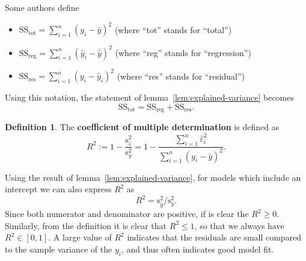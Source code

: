 \documentclass[
  a4paper,
]{article}
\providecommand{\tightlist}{%
  \setlength{\itemsep}{0pt}\setlength{\parskip}{0pt}}
\theoremstyle{definition}
\newtheorem{definition}{Definition}[section]
\theoremstyle{definition}
\theoremstyle{definition}
\theoremstyle{definition}
\theoremstyle{remark}
\begin{document}
Some authors define

\begin{itemize}
\tightlist
\item
  \(\mathrm{SS}_\mathrm{tot} = \sum_{i=1}^n (y_i - \bar y)^2\)
  (where ``tot'' stands for ``total'')
\item
  \(\mathrm{SS}_\mathrm{reg} = \sum_{i=1}^n (\hat y_i - \overline{\hat y})^2\)
  (where ``reg'' stands for ``regression'')
\item
  \(\mathrm{SS}_\mathrm{res} = \sum_{i=1}^n (y_i-\hat y_i)^2\)
  (where ``res'' stands for ``residual'')
\end{itemize}

Using this notation, the statement of lemma~\ref{lem:explained-variance}
becomes
\begin{equation*}
  \mathrm{SS}_\mathrm{tot}
  = \mathrm{SS}_\mathrm{reg} + \mathrm{SS}_\mathrm{res}.
\end{equation*}

\begin{definition}
\protect\hypertarget{def:R-squared}{}\label{def:R-squared}The \textbf{coefficient of multiple determination} is defined as
\begin{equation*}
  R^2
  := 1 - \frac{\mathrm{s}_{\hat\varepsilon}^2}{\mathrm{s}_y^2}
  = 1 - \frac{\sum_{i=1}^n \hat\varepsilon_i^2}{\sum_{i=1}^n (y_i - \bar y)^2}.
\end{equation*}
\end{definition}

Using the result of lemma~\ref{lem:explained-variance}, for models which
include an intercept we can also
express \(R^2\) as
\begin{equation*}
  R^2
  = \mathrm{s}_{\hat y}^2 / \mathrm{s}_y^2.
\end{equation*}
Since both numerator and denominator are positive, if is clear the \(R^2 \geq
0\). Similarly, from the definition it is clear that \(R^2 \leq 1\), so that we
always have \(R^2 \in [0, 1]\). A large value of \(R^2\) indicates that
the residuals are small compared to the sample variance of the \(y_i\),
and thus often indicates good model fit.
\end{document}
